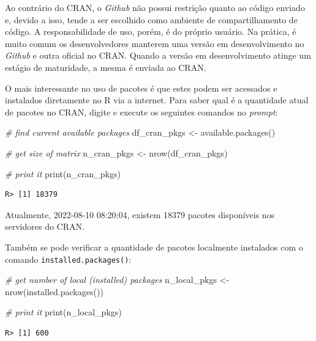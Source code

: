 \documentclass[
  11pt,
]{book}
\newenvironment{Shaded}{\begin{snugshade}}{\end{snugshade}}
\newcommand{\CommentTok}[1]{\textcolor[rgb]{0.37,0.37,0.37}{\textit{#1}}}
\newcommand{\FunctionTok}[1]{\textcolor[rgb]{0,0,0}{#1}}
\newcommand{\NormalTok}[1]{#1}
\newcommand{\OtherTok}[1]{\textcolor[rgb]{0.37,0.37,0.37}{#1}}
\begin{document}
Ao contrário do CRAN, o \emph{Github} não possui restrição quanto ao código enviado e, devido a isso, tende a ser escolhido como ambiente de compartilhamento de código. A responsabilidade de uso, porém, é do próprio usuário. Na prática, é muito comum os desenvolvedores manterem uma versão em desenvolvimento no \emph{Github} e outra oficial no CRAN. Quando a versão em desenvolvimento atinge um estágio de maturidade, a mesma é enviada ao CRAN.

O mais interessante no uso de pacotes é que estes podem ser acessados e instalados diretamente no R via a internet. Para saber qual é a quantidade atual de pacotes no CRAN, digite e execute os seguintes comandos no \emph{prompt}:

\begin{Shaded}
\begin{Highlighting}[]
\CommentTok{\# find current available packages}
\NormalTok{df\_cran\_pkgs }\OtherTok{\textless{}{-}} \FunctionTok{available.packages}\NormalTok{()}

\CommentTok{\# get size of matrix}
\NormalTok{n\_cran\_pkgs }\OtherTok{\textless{}{-}} \FunctionTok{nrow}\NormalTok{(df\_cran\_pkgs)}

\CommentTok{\# print it}
\FunctionTok{print}\NormalTok{(n\_cran\_pkgs)}
\end{Highlighting}
\end{Shaded}

\begin{verbatim}
R> [1] 18379
\end{verbatim}

Atualmente, 2022-08-10 08:20:04, existem 18379 pacotes disponíveis nos servidores do CRAN.

Também se pode verificar a quantidade de pacotes localmente instalados com o comando \texttt{installed.packages()}:

\begin{Shaded}
\begin{Highlighting}[]
\CommentTok{\# get number of local (installed) packages}
\NormalTok{n\_local\_pkgs }\OtherTok{\textless{}{-}} \FunctionTok{nrow}\NormalTok{(}\FunctionTok{installed.packages}\NormalTok{())}

\CommentTok{\# print it}
\FunctionTok{print}\NormalTok{(n\_local\_pkgs)}
\end{Highlighting}
\end{Shaded}

\begin{verbatim}
R> [1] 600
\end{verbatim}
\end{document}
